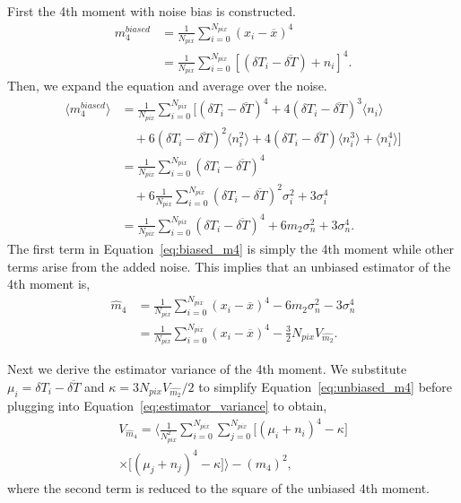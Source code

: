 \documentclass[fleqn,usenatbib]{mnras}
\begin{document}
First the 4th moment with noise bias is constructed.
\begin{align}
    m_4^{biased} 
        &= \frac{1}{N_{pix}} \sum_{i=0}^{N_{pix}}
            (x_i - \overline{x})^4 \nonumber\\
        &= \frac{1}{N_{pix}} \sum_{i=0}^{N_{pix}}
            [(\delta T_i - \overline{\delta T}) 
            + n_i]^4.
\end{align}
Then, we expand the equation and average over the noise.
\begin{align}
    \langle m_4^{biased} \rangle
        &= \frac{1}{N_{pix}} \sum_{i=0}^{N_{pix}}
            [(\delta T_i - \overline{\delta T})^4 +
            4(\delta T_i - \overline{\delta T})^3 
            \langle n_i \rangle \nonumber\\
        &\quad+ 6(\delta T_i - \overline{\delta T})^2 
            \langle n_i^2 \rangle + 
            4(\delta T_i - \overline{\delta T}) 
            \langle n_i^3 \rangle + 
            \langle n_i^4 \rangle] \nonumber\\
        &= \frac{1}{N_{pix}} \sum_{i=0}^{N_{pix}}
            (\delta T_i - \overline{\delta T})^4 \nonumber\\
        &\quad+ 6 \frac{1}{N_{pix}} \sum_{i=0}^{N_{pix}}
            (\delta T_i - \overline{\delta T})^2 
            \sigma_{i}^2 + 3 \sigma_{i}^4 \nonumber\\
        &= \frac{1}{N_{pix}} \sum_{i=0}^{N_{pix}}
            (\delta T_i - \overline{\delta T})^4 + 6 m_2 \sigma_n^2 + 3 \sigma_n^4.\label{eq:biased_m4}
\end{align}
The first term in Equation~\ref{eq:biased_m4} is simply the 4th moment while other terms arise from the added noise. This implies that an unbiased estimator of the 4th moment is,
\begin{align}
    \hat{m}_4 
        &= \frac{1}{N_{pix}} \sum_{i=0}^{N_{pix}}
            (x_i - \overline{x})^4 
            - 6 m_2 \sigma_n^2 
            - 3 \sigma_n^4 \nonumber\\
        &= \frac{1}{N_{pix}} \sum_{i=0}^{N_{pix}}
            (x_i - \overline{x})^4 
            - \frac{3}{2}N_{pix}V_{\hat{m_2}}.
    \label{eq:unbiased_m4}
\end{align}

Next we derive the estimator variance of the 4th moment. We substitute $\mu_i=\delta T_i - \overline{\delta T}$ and $\kappa=3N_{pix}V_{\hat{m_2}}/2$ to simplify Equation~\ref{eq:unbiased_m4} before plugging into Equation~\ref{eq:estimator_variance} to obtain,
\begin{equation}
    \begin{split}
        V_{\hat{m}_4} = \biggl\langle \frac{1}{N_{pix}^2}
            \sum_{i=0}^{N_{pix}}\sum_{j=0}^{N_{pix}}
            \lbrack(\mu_i+n_i)^4-\kappa\rbrack \\
        \times \lbrack(\mu_j+n_j)^4-\kappa\rbrack
            \biggr\rangle - (m_4)^2,
    \end{split}
\end{equation}
where the second term is reduced to the square of the unbiased 4th moment.
\end{document}
